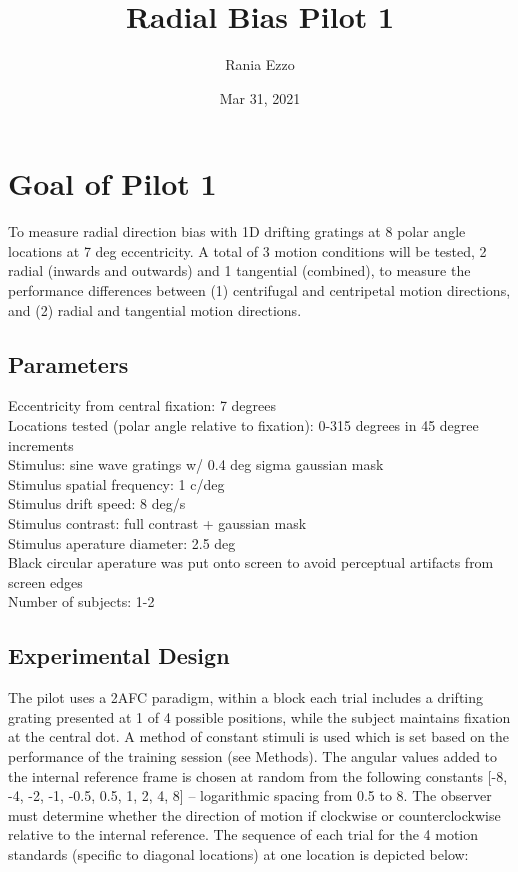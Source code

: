 \documentclass[11pt]{article} %
\title{Radial Bias Pilot 1}
\date{Mar 31, 2021}
\author{Rania Ezzo}
\begin{document}
\maketitle
\tableofcontents


\section{Goal of Pilot 1}
To measure radial direction bias with 1D drifting gratings at 8 polar angle locations at 7 deg eccentricity. A total of 3 motion conditions will be tested, 2 radial (inwards and outwards) and 1 tangential (combined), to measure the performance differences between (1) centrifugal and centripetal motion directions, and (2) radial and tangential motion directions. 

\subsection{Parameters}
Eccentricity from central fixation: 7 degrees
\\
Locations tested (polar angle relative to fixation): 0-315 degrees in 45 degree increments
\\
Stimulus: sine wave gratings w/ 0.4 deg sigma gaussian mask
\\
Stimulus spatial frequency: 1 c/deg
\\
Stimulus drift speed: 8 deg/s
\\
Stimulus contrast: full contrast + gaussian mask
\\
Stimulus aperature diameter: 2.5 deg
\\
Black circular aperature was put onto screen to avoid perceptual artifacts from screen edges
\\
Number of subjects: 1-2

\subsection{Experimental Design}
The pilot uses a 2AFC paradigm, within a block each trial includes a drifting grating presented at 1 of 4 possible positions, while the subject maintains fixation at the central dot. A method of constant stimuli is used which is set based on the performance of the training session (see Methods). The angular values added to the internal reference frame is chosen at random from the following constants [-8, -4, -2, -1, -0.5, 0.5, 1, 2, 4, 8] -- logarithmic spacing from 0.5 to 8. The observer must determine whether the direction of motion if clockwise or counterclockwise relative to the internal reference. The sequence of each trial for the 4 motion standards (specific to diagonal locations) at one location is depicted below:
\end{document}
